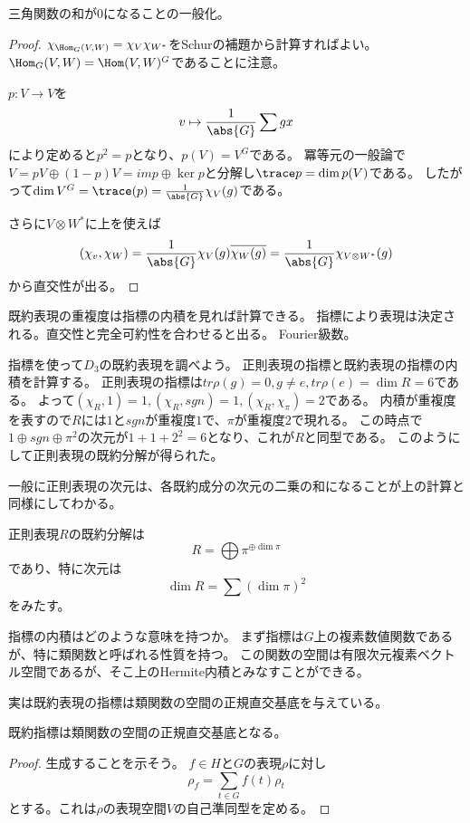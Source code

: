 \documentclass{jsarticle}
\begin{document}
三角関数の和が$0$になることの一般化。

\begin{proof}
$\chi_{\Hom_G(V,W)}=\chi_V\chi_{W^*}$をSchurの補題から計算すればよい。
$\Hom_G(V,W)=\Hom(V,W)^G$であることに注意。

$p\colon V\to V$を
\[
v\mapsto\frac{1}{\abs{G}}\sum gx
\]
により定めると$p^2=p$となり、$p(V)=V^G$である。
冪等元の一般論で$V=pV\oplus(1-p)V=im p\oplus\ker p$と分解し$\trace p=\dim p(V)$である。
したがって$\dim V^G=\trace(p)=\frac{1}{\abs{G}}\chi_V(g)$である。

さらに$V\otimes W^*$に上を使えば
\[
(\chi_v,\chi_W)=\frac{1}{\abs{G}}\chi_V(g)\overline{\chi_W(g)}=\frac{1}{\abs{G}}\chi_{V\otimes W^*}(g)
\]
から直交性が出る。
\end{proof}

既約表現の重複度は指標の内積を見れば計算できる。
指標により表現は決定される。直交性と完全可約性を合わせると出る。
Fourier級数。

指標を使って$D_3$の既約表現を調べよう。
正則表現の指標と既約表現の指標の内積を計算する。
正則表現の指標は$tr\rho(g)=0, g\neq e, tr\rho(e)=\dim R=6$である。
よって$(\chi_R,1)=1, (\chi_R,sgn)=1, (\chi_R,\chi_\pi)=2$である。
内積が重複度を表すので$R$には$1$と$sgn$が重複度$1$で、$\pi$が重複度$2$で現れる。
この時点で$1\oplus sgn\oplus \pi^2$の次元が$1+1+2^2=6$となり、これが$R$と同型である。
このようにして正則表現の既約分解が得られた。

一般に正則表現の次元は、各既約成分の次元の二乗の和になることが上の計算と同様にしてわかる。
\begin{prob}
正則表現$R$の既約分解は
\[
R=\bigoplus\pi^{\oplus\dim\pi}
\]
であり、特に次元は
\[
\dim R=\sum(\dim\pi)^2
\]
をみたす。
\end{prob}

指標の内積はどのような意味を持つか。
まず指標は$G$上の複素数値関数であるが、特に類関数と呼ばれる性質を持つ。
この関数の空間は有限次元複素ベクトル空間であるが、そこ上のHermite内積とみなすことができる。

実は既約表現の指標は類関数の空間の正規直交基底を与えている。

\begin{prop}
既約指標は類関数の空間の正規直交基底となる。
\end{prop}
\begin{proof}
生成することを示そう。
$f\in H$と$G$の表現$\rho$に対し
\[
\rho_f=\sum_{t\in G}f(t)\rho_t
\]
とする。これは$\rho$の表現空間$V$の自己準同型を定める。
\end{proof}
\end{document}
